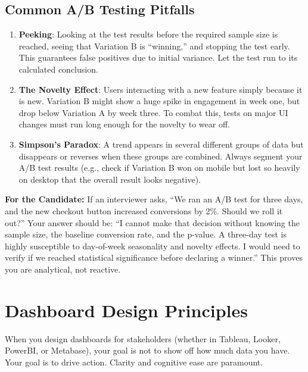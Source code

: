 \documentclass[
  11pt,
  openany,
  oneside]{book}
\providecommand{\tightlist}{%
  \setlength{\itemsep}{0pt}\setlength{\parskip}{0pt}}
\renewenvironment{quote}{\begin{customquote}}{\end{customquote}}
\begin{document}
\subsection{Common A/B Testing
Pitfalls}\label{common-ab-testing-pitfalls}

\begin{enumerate}
\def\labelenumi{\arabic{enumi}.}
\tightlist
\item
  \textbf{Peeking}: Looking at the test results before the required
  sample size is reached, seeing that Variation B is ``winning,'' and
  stopping the test early. This guarantees false positives due to
  initial variance. Let the test run to its calculated conclusion.
\item
  \textbf{The Novelty Effect}: Users interacting with a new feature
  simply because it is new. Variation B might show a huge spike in
  engagement in week one, but drop below Variation A by week three. To
  combat this, tests on major UI changes must run long enough for the
  novelty to wear off.
\item
  \textbf{Simpson's Paradox}: A trend appears in several different
  groups of data but disappears or reverses when these groups are
  combined. Always segment your A/B test results (e.g., check if
  Variation B won on mobile but lost so heavily on desktop that the
  overall result looks negative).
\end{enumerate}

\begin{quote}
\textbf{For the Candidate:} If an interviewer asks, ``We ran an A/B test
for three days, and the new checkout button increased conversions by
2\%. Should we roll it out?'' Your answer should be: ``I cannot make
that decision without knowing the sample size, the baseline conversion
rate, and the p-value. A three-day test is highly susceptible to
day-of-week seasonality and novelty effects. I would need to verify if
we reached statistical significance before declaring a winner.'' This
proves you are analytical, not reactive.
\end{quote}

\bigskip

\section{Dashboard Design Principles}\label{dashboard-design-principles}

When you design dashboards for stakeholders (whether in Tableau, Looker,
PowerBI, or Metabase), your goal is not to show off how much data you
have. Your goal is to drive action. Clarity and cognitive ease are
paramount.
\end{document}
